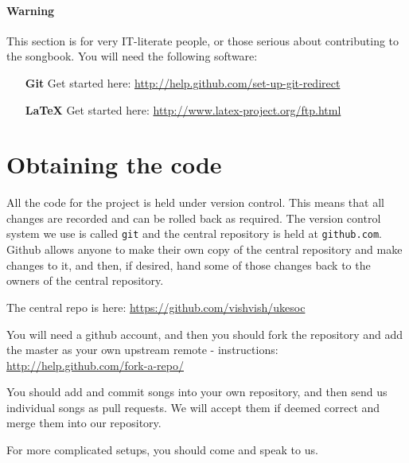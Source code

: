 \documentclass[10pt,a4paper,oneside]{book}
\begin{document}
\paragraph{Warning} %
\label{par:warning}

This section is for very IT-literate people, or those serious about contributing to the songbook. You will need the following software:

\begin{itemize}
	\item[\textbf{Git}]Get started here: \url{http://help.github.com/set-up-git-redirect}
	\item[\textbf{LaTeX}]Get started here: \url{http://www.latex-project.org/ftp.html}
\end{itemize}

\section{Obtaining the code} %
\label{sec:obtaining_the_code}

All the code for the project is held under version control. This means that all changes are recorded and can be rolled back as required. The version control system we use is called \texttt{git} and the central repository is held at \texttt{github.com}. Github allows anyone to make their own copy of the central repository and make changes to it, and then, if desired, hand some of those changes back to the owners of the central repository.

The central repo is here: \url{https://github.com/vishvish/ukesoc}

You will need a github account, and then you should fork the repository and add the master as your own upstream remote - instructions: \url{http://help.github.com/fork-a-repo/}

You should add and commit songs into your own repository, and then send us individual songs as pull requests. We will accept them if deemed correct and merge them into our repository.

For more complicated setups, you should come and speak to us.



\end{document}
